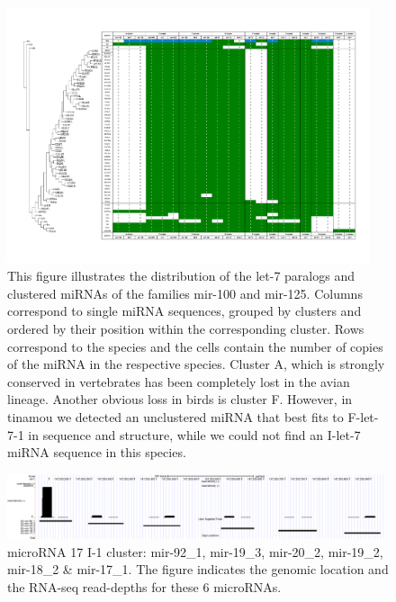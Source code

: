 \documentclass[10pt]{bmc_article}
\newenvironment{bmcformat}{\begin{raggedright}\baselineskip20pt\sloppy\setboolean{publ}{false}}{\end{raggedright}\baselineskip20pt\sloppy}
\begin{document}
\begin{bmcformat}
\begin{figure}[ht]
  \includegraphics[width=0.95\textwidth]{figures/let-7-cluster.pdf}
  \caption[Presence/absence table of let-7 miRNA clusters]{This figure
    illustrates the distribution of the let-7 paralogs and clustered
    miRNAs of the families mir-100 and mir-125. Columns correspond to
    single miRNA sequences, grouped by clusters and ordered by their
    position within the corresponding cluster. Rows correspond to the
    species and the cells contain the number of copies of the miRNA in
    the respective species. Cluster A, which is strongly conserved in
    vertebrates has been completely lost in the avian lineage. Another
    obvious loss in birds is cluster F. However, in tinamou we
    detected an unclustered miRNA that best fits to F-let-7-1 in
    sequence and structure, while we could not find an I-let-7 miRNA
    sequence in this species.}\label{fig:9}
\end{figure}



\begin{figure}[ht]
\includegraphics[width=0.99\textwidth]{figures/mir-17-I-1-cluster.pdf}
  \caption[]{microRNA 17 I-1 cluster: mir-92\_1, mir-19\_3, mir-20\_2,
    mir-19\_2, mir-18\_2 \& mir-17\_1. The figure indicates the
    genomic location and the RNA-seq read-depths for these 6
    microRNAs.}\label{fig:10}
\end{figure}


\end{bmcformat}
\end{document}
